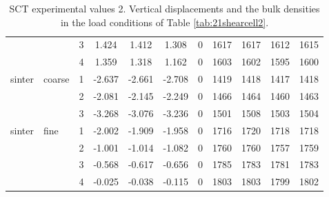 \begin{table}
\begin{tabular}{ll|c|cccc|cccc}
          &       & 3     & 1.424 & 1.412 & 1.308 & 0     & 1617  & 1617  & 1612  & 1615 \\
          &       & 4     & 1.359 & 1.318 & 1.162 & 0     & 1603  & 1602  & 1595  & 1600 \\
\hline 
    sinter & coarse & 1     & -2.637 & -2.661 & -2.708 & 0     & 1419  & 1418  & 1417  & 1418 \\
          &       & 2     & -2.081 & -2.145 & -2.249 & 0     & 1466  & 1464  & 1460  & 1463 \\
          &       & 3     & -3.268 & -3.076 & -3.236 & 0     & 1501  & 1508  & 1503  & 1504 \\
\hline 
    sinter & fine  & 1     & -2.002 & -1.909 & -1.958 & 0     & 1716  & 1720  & 1718  & 1718 \\
          &       & 2     & -1.001 & -1.014 & -1.082 & 0     & 1760  & 1760  & 1757  & 1759 \\
          &       & 3     & -0.568 & -0.617 & -0.656 & 0     & 1785  & 1783  & 1781  & 1783 \\
          &       & 4     & -0.025 & -0.038 & -0.115 & 0     & 1803  & 1803  & 1799  & 1802 \\
    \hline
\end{tabular}
\caption[SCT experimental values 2]{\acs{SCT} experimental values 2. Vertical
displacements and the bulk densities in the load conditions of Table
\ref{tab:21shearcell2}.}
\label{tab:20shearcell1}
\end{table}